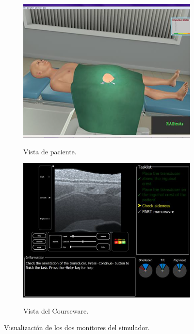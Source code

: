 \begin{figure}[h]
    \begin{subfigure}[b]{0.45\linewidth}
        \centering
        {\includegraphics[width=\linewidth]{IMG/vistapaciente.png}}
        \caption{Vista de paciente.}
    \end{subfigure}
    \null\hfill
     \begin{subfigure}[b]{0.45\linewidth}
        \centering
        {\includegraphics[width=\linewidth]{IMG/courseware.png}}
        \caption{Vista del \ac{Courseware}.}
    \end{subfigure}
    \caption{Visualización de los dos monitores del simulador. \label{fig:simui}}
   \end{figure}

